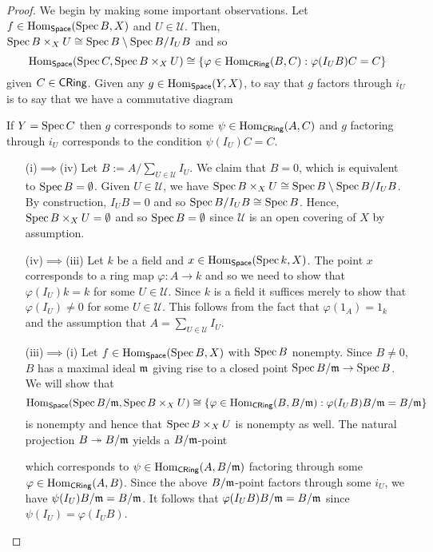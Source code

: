 \documentclass[11pt]{article}
\renewcommand{\phi}{\varphi}
\newcommand{\U}{\mathscr{U}}
\begin{document}
\begin{proof}
We begin by making some important observations. Let $f\in\operatorname{Hom}_{\operatorname{\mathsf{Space}}}(\operatorname{Spec} B,X)$ and $U\in\U$. Then, $\operatorname{Spec} B\times_XU\cong\operatorname{Spec} B\setminus\operatorname{Spec} B/I_UB$ and so 
$$\Hom_{\Space}(\Spec C,\Spec B\times_XU)\iso\{\phi\in\Hom_{\CRing}(B,C) : \phi(I_UB)C=C\}$$
given $C\in\operatorname{\mathsf{CRing}}$. Given any $g\in\operatorname{Hom}_{\operatorname{\mathsf{Space}}}(Y,X)$, to say that $g$ factors through $i_U$ is to say that we have a commutative diagram
\begin{center}
\end{center}
If $Y=\operatorname{Spec} C$ then $g$ corresponds to some $\psi\in\operatorname{Hom}_{\operatorname{\mathsf{CRing}}}(A,C)$ and $g$ factoring through $i_U$ corresponds to the condition $\psi(I_U)C=C$.
\begin{enumerate}
\item[(i)$\implies$(iv)] Let $B:=A/\sum_{U\in\U}I_U$. We claim that $B=0$, which is equivalent to $\operatorname{Spec} B=\emptyset$. Given $U\in\U$, we have $\operatorname{Spec} B\times_XU\cong\operatorname{Spec} B\setminus\operatorname{Spec} B/I_UB$. By construction, $I_UB=0$ and so $\operatorname{Spec} B/I_UB\cong\operatorname{Spec} B$. Hence, $\operatorname{Spec} B\times_XU=\emptyset$ and so $\operatorname{Spec} B=\emptyset$ since $\U$ is an open covering of $X$ by assumption.

\item[(iv)$\implies$(iii)] Let $k$ be a field and $x\in\operatorname{Hom}_{\operatorname{\mathsf{Space}}}(\operatorname{Spec} k,X)$. The point $x$ corresponds to a ring map $\phi: A\to k$ and so we need to show that $\phi(I_U)k=k$ for some $U\in\U$. Since $k$ is a field it suffices merely to show that $\phi(I_U)\neq0$ for some $U\in\U$. This follows from the fact that $\phi(1_A)=1_k$ and the assumption that $A=\sum_{U\in\U}I_U$.

\item[(iii)$\implies$(i)] Let $f\in\operatorname{Hom}_{\operatorname{\mathsf{Space}}}(\operatorname{Spec} B,X)$ with $\operatorname{Spec} B$ nonempty. Since $B\neq0$, $B$ has a maximal ideal $\mathfrak{m}$ giving rise to a closed point $\operatorname{Spec} B/\mathfrak{m}\to\operatorname{Spec} B$. We will show that 
$$\Hom_{\Space}(\Spec B/\m,\Spec B\times_XU)\iso\{\phi\in\Hom_{\CRing}(B,B/\m) : \phi(I_UB)B/\m=B/\m\}$$
is nonempty and hence that $\operatorname{Spec} B\times_XU$ is nonempty as well. The natural projection $B\twoheadrightarrow B/\mathfrak{m}$ yields a $B/\mathfrak{m}$-point
\begin{center}
\end{center}
which corresponds to $\psi\in\operatorname{Hom}_{\operatorname{\mathsf{CRing}}}(A,B/\mathfrak{m})$ factoring through some $\phi\in\Hom_{\CRing}(A,B)$. Since the above $B/\mathfrak{m}$-point factors through some $i_U$, we have $\psi(I_U)B/\mathfrak{m}=B/\mathfrak{m}$. It follows that $\phi(I_UB)B/\m=B/\m$ since $\psi(I_U)=\phi(I_UB)$.


\end{enumerate}
\end{proof}
\end{document}
